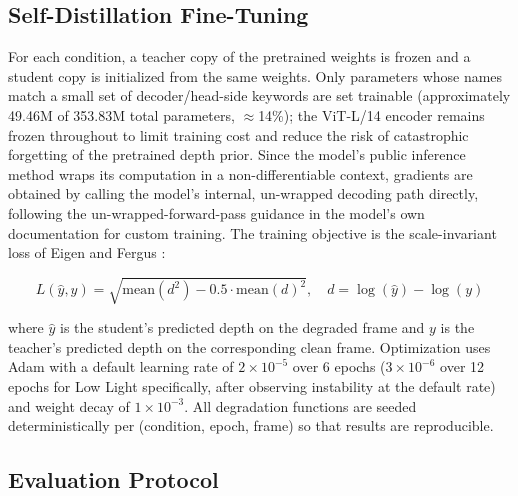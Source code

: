 \documentclass[conference]{IEEEtran}
\begin{document}
\subsection{Self-Distillation Fine-Tuning}

For each condition, a teacher copy of the pretrained weights is frozen and a student copy is initialized from the same weights. Only parameters whose names match a small set of decoder/head-side keywords are set trainable (approximately 49.46M of 353.83M total parameters, $\approx$14\%); the ViT-L/14 encoder remains frozen throughout to limit training cost and reduce the risk of catastrophic forgetting of the pretrained depth prior. Since the model's public inference method wraps its computation in a non-differentiable context, gradients are obtained by calling the model's internal, un-wrapped decoding path directly, following the un-wrapped-forward-pass guidance in the model's own documentation for custom training. The training objective is the scale-invariant loss of Eigen and Fergus \cite{ref2}:

\begin{equation}
L(\hat{y}, y) = \sqrt{\text{mean}(d^2) - 0.5 \cdot \text{mean}(d)^2}, \quad d = \log(\hat{y}) - \log(y)
\label{eq:silog}
\end{equation}

where $\hat{y}$ is the student's predicted depth on the degraded frame and $y$ is the teacher's predicted depth on the corresponding clean frame. Optimization uses Adam with a default learning rate of $2\times10^{-5}$ over 6 epochs ($3\times10^{-6}$ over 12 epochs for Low Light specifically, after observing instability at the default rate) and weight decay of $1\times10^{-3}$. All degradation functions are seeded deterministically per (condition, epoch, frame) so that results are reproducible.

\subsection{Evaluation Protocol}
\end{document}
